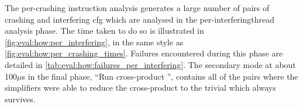 The per-crashing instruction analysis generates a large number of
pairs of crashing {\StateMachine} and interfering \gls{cfg} which are
analysed in the per-\gls{interferingthread} analysis phase.  The time
taken to do so is illustrated in
\autoref{fig:eval:how:per_interfering}, in the same style as
\autoref{fig:eval:how:per_crashing_times}.  Failures encountered
during this phase are detailed in
\autoref{tab:eval:how:failures_per_interfering}.  The secondary mode
at about 100$\mu$s in the final phase, ``Run cross-product
{\StateMachine}'', contains all of the {\StateMachine} pairs where the
{\StateMachine} simplifiers were able to reduce the cross-product
{\StateMachine} to the trivial {\StateMachine} which always survives.

\begin{sanefig}
  \caption{Time taken by per-\gls{interferingthread} analysis steps,
    in seconds, as distributions over the 27535 interfering
    \glspl{cfg} generated by the per-crashing instruction phase.  In
    this figure, the {\StateMachine}-building steps include
    {\StateMachine} simplification.  The second step, ``Rederive
    crashing {\StateMachine}'', performs various additional
    simplifications to the crashing {\StateMachine} which become
    possible once {\implementation} has identified the interfering
    {\StateMachine}.}
  \label{fig:eval:how:per_interfering}
\end{sanefig}

